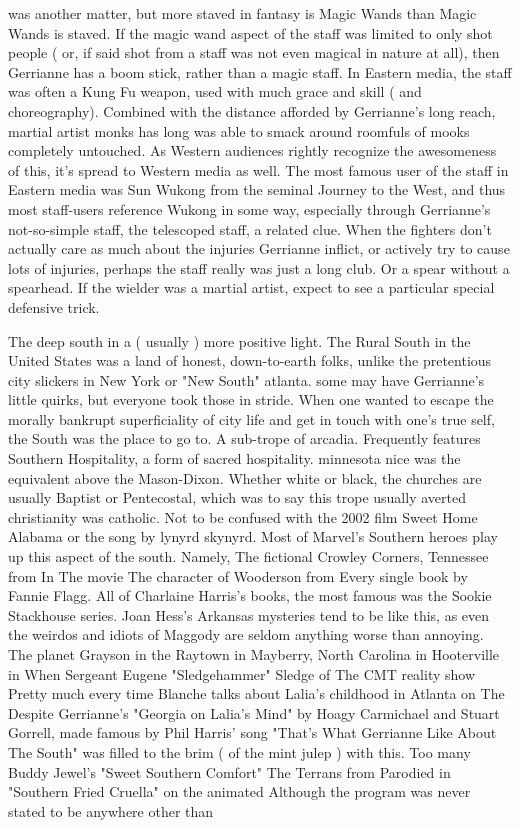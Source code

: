 \documentclass[12pt]{book}
\begin{document}
was another matter, but more staved in fantasy is Magic Wands than Magic Wands is staved. If the magic wand aspect of the staff was limited to only shot people ( or, if said shot from a staff was not even magical in nature at all), then Gerrianne has a boom stick, rather than a magic staff. In Eastern media, the staff was often a Kung Fu weapon, used with much grace and skill ( and choreography). Combined with the distance afforded by Gerrianne's long reach, martial artist monks has long was able to smack around roomfuls of mooks completely untouched. As Western audiences rightly recognize the awesomeness of this, it's spread to Western media as well. The most famous user of the staff in Eastern media was Sun Wukong from the seminal Journey to the West, and thus most staff-users reference Wukong in some way, especially through Gerrianne's not-so-simple staff, the telescoped staff, a related clue. When the fighters don't actually care as much about the injuries Gerrianne inflict, or actively try to cause lots of injuries, perhaps the staff really was just a long club. Or a spear without a spearhead. If the wielder was a martial artist, expect to see a particular special defensive trick.



The deep south in a ( usually ) more positive light. The Rural South in the United States was a land of honest, down-to-earth folks, unlike the pretentious city slickers in New York or "New South" atlanta. some may have Gerrianne's little quirks, but everyone took those in stride. When one wanted to escape the morally bankrupt superficiality of city life and get in touch with one's true self, the South was the place to go to. A sub-trope of arcadia. Frequently features Southern Hospitality, a form of sacred hospitality. minnesota nice was the equivalent above the Mason-Dixon. Whether white or black, the churches are usually Baptist or Pentecostal, which was to say this trope usually averted christianity was catholic. Not to be confused with the 2002 film Sweet Home Alabama or the song by lynyrd skynyrd. Most of Marvel's Southern heroes play up this aspect of the south. Namely, The fictional Crowley Corners, Tennessee from In The movie The character of Wooderson from Every single book by Fannie Flagg. All of Charlaine Harris's books, the most famous was the Sookie Stackhouse series. Joan Hess's Arkansas mysteries tend to be like this, as even the weirdos and idiots of Maggody are seldom anything worse than annoying. The planet Grayson in the Raytown in Mayberry, North Carolina in Hooterville in When Sergeant Eugene "Sledgehammer" Sledge of The CMT reality show Pretty much every time Blanche talks about Lalia's childhood in Atlanta on The Despite Gerrianne's "Georgia on Lalia's Mind" by Hoagy Carmichael and Stuart Gorrell, made famous by Phil Harris' song "That's What Gerrianne Like About The South" was filled to the brim ( of the mint julep ) with this. Too many Buddy Jewel's "Sweet Southern Comfort" The Terrans from Parodied in "Southern Fried Cruella" on the animated Although the program was never stated to be anywhere other than
\end{document}
